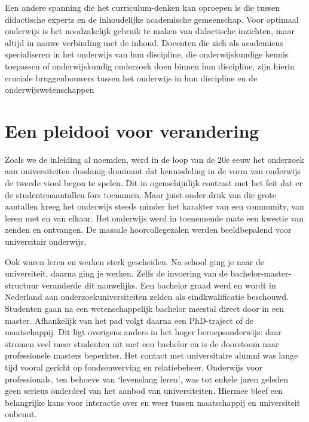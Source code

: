 \documentclass[empirical, authordate, ]{new-jote-article}
\begin{document}
	Een andere spanning die het curriculum-denken kan oproepen is die tussen didactische experts en de inhoudelijke academische gemeenschap. Voor optimaal onderwijs is het noodzakelijk gebruik te maken van didactische inzichten, maar altijd in nauwe verbinding met de inhoud. Docenten die zich als academicus specialiseren in het onderwijs van hun discipline, die onderwijskundige kennis toepassen of onderwijskundig onderzoek doen binnen hun discipline, zijn hierin cruciale bruggenbouwers tussen het onderwijs in hun discipline en de onderwijswetenschappen



	\section{Een pleidooi voor verandering}



	Zoals we de inleiding al noemden, werd in de loop van de 20e eeuw het onderzoek aan universiteiten dusdanig dominant dat kennisdeling in de vorm van onderwijs de tweede viool begon te spelen. Dit in ogenschijnlijk contrast met het feit dat er de studentenaantallen fors toenamen. Maar juist onder druk van die grote aantallen kreeg het onderwijs steeds minder het karakter van een community, van leren met en van elkaar. Het onderwijs werd in toenemende mate een kwestie van zenden en ontvangen. De massale hoorcollegezalen werden beeldbepalend voor universitair onderwijs.



	Ook waren leren en werken sterk gescheiden. Na school ging je naar de universiteit, daarna ging je werken. Zelfs de invoering van de bachelor-master-structuur veranderde dit nauwelijks. Een bachelor graad werd en wordt in Nederland aan onderzoekuniversiteiten zelden als eindkwalificatie beschouwd. Studenten gaan na een wetenschappelijk bachelor meestal direct door in een master. Afhankelijk van het pad volgt daarna een PhD-traject of de maatschappij. Dit ligt overigens anders in het hoger beroepsonderwijs: daar stromen veel meer studenten uit met een bachelor en is de doorstoom naar professionele masters beperkter. Het contact met universitaire alumni was lange tijd vooral gericht op fondsenwerving en relatiebeheer. Onderwijs voor professionals, ten behoeve van ‘levenslang leren', was tot enkele jaren geleden geen serieus onderdeel van het aanbod van universiteiten. Hiermee bleef een belangrijke kans voor interactie over en weer tussen maatschappij en universiteit onbenut.
\end{document}
